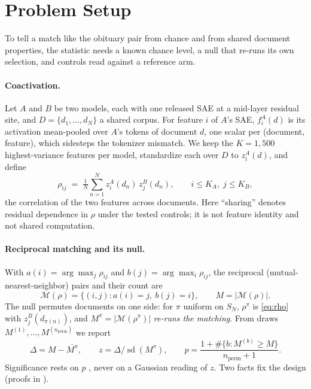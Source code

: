 \section{Problem Setup}\label{sec:method}

To tell a match like the obituary pair from chance and from shared document properties, the
statistic needs a known chance level, a null that re-runs its own selection, and controls read
against a reference arm.

\paragraph{Coactivation.} Let $A$ and $B$ be two models, each with one released SAE at a
mid-layer residual site, and $D=\{d_1,\dots,d_N\}$ a shared corpus. For feature $i$ of $A$'s SAE,
$f^A_i(d)$ is its activation mean-pooled over $A$'s tokens of document $d$, one scalar per
(document, feature), which sidesteps the tokenizer mismatch. We keep the $K{=}1{,}500$
highest-variance features per model, standardize each over $D$ to $z^A_i(d)$, and define
\begin{equation}\label{eq:rho}
\rho_{ij} \;=\; \tfrac{1}{N}\textstyle\sum_{n=1}^{N} z^A_i(d_n)\, z^B_j(d_n),
\qquad i\le K_A,\; j\le K_B,
\end{equation}
the correlation of the two features across documents. Here ``sharing'' denotes residual dependence in $\rho$
under the tested controls; it is not feature identity and not shared computation.

\paragraph{Reciprocal matching and its null.} With $a(i)=\arg\max_j\rho_{ij}$ and
$b(j)=\arg\max_i\rho_{ij}$, the reciprocal (mutual-nearest-neighbor) pairs and their count are
\begin{equation}\label{eq:count}
\mathcal{M}(\rho)=\{(i,j):a(i)=j,\ b(j)=i\},\qquad M=|\mathcal{M}(\rho)|.
\end{equation}
The null permutes documents on one side: for $\pi$ uniform on $S_N$, $\rho^{\pi}$ is
\eqref{eq:rho} with $z^B_j(d_{\pi(n)})$, and $M^{\pi}=|\mathcal{M}(\rho^{\pi})|$ \emph{re-runs the
matching}. From draws $M^{(1)},\dots,M^{(n_{\text{perm}})}$ we report
\begin{equation}\label{eq:excess}
\Delta = M-\overline{M^{\pi}},\qquad z=\Delta/\operatorname{sd}(M^{\pi}),\qquad
p=\frac{1+\#\{b: M^{(b)}\ge M\}}{n_{\text{perm}}+1}.
\end{equation}
Significance rests on $p$ \citep{phipson2010permutation}, never on a Gaussian reading of $z$.
Two facts fix the design (proofs in ).

